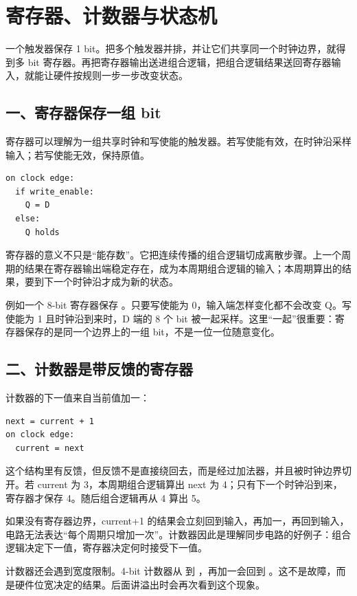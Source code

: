 \chapter{寄存器、计数器与状态机}

一个触发器保存 1 bit。把多个触发器并排，并让它们共享同一个时钟边界，就得到多 bit 寄存器。再把寄存器输出送进组合逻辑，把组合逻辑结果送回寄存器输入，就能让硬件按规则一步一步改变状态。

\section{一、寄存器保存一组 bit}

寄存器可以理解为一组共享时钟和写使能的触发器。若写使能有效，在时钟沿采样输入；若写使能无效，保持原值。

\begin{lstlisting}
on clock edge:
  if write_enable:
    Q = D
  else:
    Q holds
\end{lstlisting}

寄存器的意义不只是“能存数”。它把连续传播的组合逻辑切成离散步骤。上一个周期的结果在寄存器输出端稳定存在，成为本周期组合逻辑的输入；本周期算出的结果，要到下一个时钟沿才成为新的状态。

例如一个 8-bit 寄存器保存 。只要写使能为 0，输入端怎样变化都不会改变 Q。写使能为 1 且时钟沿到来时，D 端的 8 个 bit 被一起采样。这里“一起”很重要：寄存器保存的是同一个边界上的一组 bit，不是一位一位随意变化。

\section{二、计数器是带反馈的寄存器}

计数器的下一值来自当前值加一：

\begin{lstlisting}
next = current + 1
on clock edge:
  current = next
\end{lstlisting}

这个结构里有反馈，但反馈不是直接绕回去，而是经过加法器，并且被时钟边界切开。若 current 为 3，本周期组合逻辑算出 next 为 4；只有下一个时钟沿到来，寄存器才保存 4。随后组合逻辑再从 4 算出 5。

如果没有寄存器边界，current+1 的结果会立刻回到输入，再加一，再回到输入，电路无法表达“每个周期只增加一次”。计数器因此是理解同步电路的好例子：组合逻辑决定下一值，寄存器决定何时接受下一值。

计数器还会遇到宽度限制。4-bit 计数器从  到 ，再加一会回到 。这不是故障，而是硬件位宽决定的结果。后面讲溢出时会再次看到这个现象。

